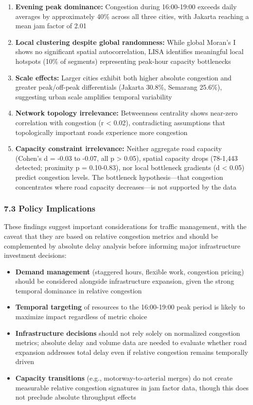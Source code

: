 \documentclass[
  12pt,
]{article}
\providecommand{\tightlist}{%
  \setlength{\itemsep}{0pt}\setlength{\parskip}{0pt}}
\begin{document}
\begin{enumerate}
\def\labelenumi{\arabic{enumi}.}
\item
  \textbf{Evening peak dominance:} Congestion during 16:00-19:00 exceeds daily averages by approximately 40\% across all three cities, with Jakarta reaching a mean jam factor of 2.01
\item
  \textbf{Local clustering despite global randomness:} While global Moran's I shows no significant spatial autocorrelation, LISA identifies meaningful local hotspots (10\% of segments) representing peak-hour capacity bottlenecks
\item
  \textbf{Scale effects:} Larger cities exhibit both higher absolute congestion and greater peak/off-peak differentials (Jakarta 30.8\%, Semarang 25.6\%), suggesting urban scale amplifies temporal variability
\item
  \textbf{Network topology irrelevance:} Betweenness centrality shows near-zero correlation with congestion (r \textless{} 0.02), contradicting assumptions that topologically important roads experience more congestion
\item
  \textbf{Capacity constraint irrelevance:} Neither aggregate road capacity (Cohen's d = -0.03 to -0.07, all p \textgreater{} 0.05), spatial capacity drops (78-1,443 detected; proximity p = 0.10-0.83), nor local bottleneck gradients (\textbar d\textbar{} \textless{} 0.05) predict congestion levels. The bottleneck hypothesis---that congestion concentrates where road capacity decreases---is not supported by the data
\end{enumerate}

\subsubsection{7.3 Policy Implications}\label{policy-implications}

These findings suggest important considerations for traffic management, with the caveat that they are based on relative congestion metrics and should be complemented by absolute delay analysis before informing major infrastructure investment decisions:

\begin{itemize}
\tightlist
\item
  \textbf{Demand management} (staggered hours, flexible work, congestion pricing) should be considered alongside infrastructure expansion, given the strong temporal dominance in relative congestion
\item
  \textbf{Temporal targeting} of resources to the 16:00-19:00 peak period is likely to maximize impact regardless of metric choice
\item
  \textbf{Infrastructure decisions} should not rely solely on normalized congestion metrics; absolute delay and volume data are needed to evaluate whether road expansion addresses total delay even if relative congestion remains temporally driven
\item
  \textbf{Capacity transitions} (e.g., motorway-to-arterial merges) do not create measurable relative congestion signatures in jam factor data, though this does not preclude absolute throughput effects
\end{itemize}
\end{document}
